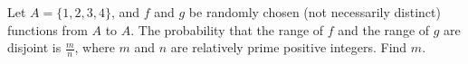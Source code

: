 Let $A=\{1,2,3,4\}$, and $f$ and $g$ be randomly chosen (not necessarily distinct) functions from $A$ to $A$. The probability that the range of $f$ and the range of $g$ are disjoint is $\tfrac{m}{n}$, where $m$ and $n$ are relatively prime positive integers. Find $m$.